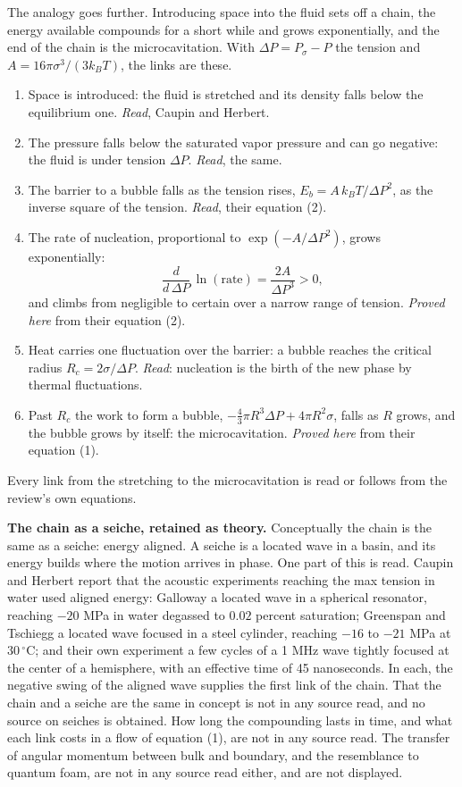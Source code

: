 The analogy goes further. Introducing space into the fluid sets off a chain, the energy available
compounds for a short while and grows exponentially, and the end of the chain is the
microcavitation. With $\Delta P = P_\sigma - P$ the tension and $A = 16\pi\sigma^3/(3k_BT)$, the
links are these.

\begin{enumerate}
\item Space is introduced: the fluid is stretched and its density falls below the equilibrium one.
\emph{Read}, Caupin and Herbert.
\item The pressure falls below the saturated vapor pressure and can go negative: the fluid is under
tension $\Delta P$. \emph{Read}, the same.
\item The barrier to a bubble falls as the tension rises, $E_b = A\,k_BT/\Delta P^2$, as the inverse
square of the tension. \emph{Read}, their equation (2).
\item The rate of nucleation, proportional to $\exp(-A/\Delta P^2)$, grows exponentially:
\[
\frac{d}{d\,\Delta P}\,\ln(\text{rate}) = \frac{2A}{\Delta P^3} > 0 ,
\]
and climbs from negligible to certain over a narrow range of tension. \emph{Proved here} from
their equation (2).
\item Heat carries one fluctuation over the barrier: a bubble reaches the critical radius
$R_c = 2\sigma/\Delta P$. \emph{Read}: nucleation is the birth of the new phase by thermal
fluctuations.
\item Past $R_c$ the work to form a bubble, $-\tfrac43\pi R^3\Delta P + 4\pi R^2\sigma$, falls as $R$
grows, and the bubble grows by itself: the microcavitation. \emph{Proved here} from their
equation (1).
\end{enumerate}

Every link from the stretching to the microcavitation is read or follows from the review's own
equations.

\textbf{The chain as a seiche, retained as theory.} Conceptually the chain is the same as a seiche:
energy aligned. A seiche is a located wave in a basin, and its energy builds where the motion
arrives in phase. One part of this is read. Caupin and Herbert report that the acoustic experiments
reaching the max tension in water used aligned energy: Galloway a located wave in a spherical
resonator, reaching $-20$ MPa in water degassed to $0.02$ percent saturation; Greenspan and
Tschiegg a located wave focused in a steel cylinder, reaching $-16$ to $-21$ MPa at
$30\,^\circ$C; and their own experiment a few cycles of a 1 MHz wave tightly focused at the center
of a hemisphere, with an effective time of 45 nanoseconds. In each, the negative swing of the
aligned wave supplies the first link of the chain. That the chain and a seiche are the same in
concept is not in any source read, and no source on seiches is obtained. How long the compounding lasts in time, and what each link costs in a flow of equation
(1), are not in any source read. The transfer of angular momentum between bulk and boundary, and
the resemblance to quantum foam, are not in any source read either, and are not displayed.

